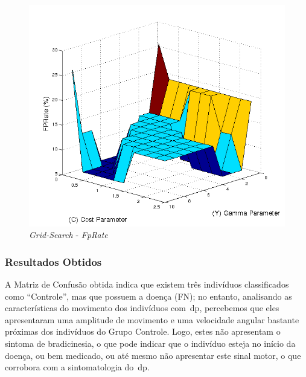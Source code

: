 \begin{figure}[!h]
 \centering
 \includegraphics[scale=0.7]{./img/gridsearchfprate.png}
\caption{\textit{Grid-Search} - \textit{FpRate}}
 \label{fig:gridfprate}
\end{figure}


\subsubsection{Resultados Obtidos}\label{sec:resultado_obtido_svm}


A Matriz de Confusão obtida indica que existem três indivíduos classificados como ``Controle'', mas que possuem a doença (FN); no entanto, analisando as características do movimento dos indivíduos com~\ac{dp}, percebemos que eles apresentaram uma amplitude de movimento e uma velocidade angular bastante próximas dos indivíduos do Grupo Controle. Logo, estes não apresentam o sintoma de bradicinesia, o que pode indicar que o indivíduo esteja no início da doença, ou bem medicado, ou até mesmo não apresentar este sinal motor, o que corrobora com a sintomatologia do~\ac{dp}. 

